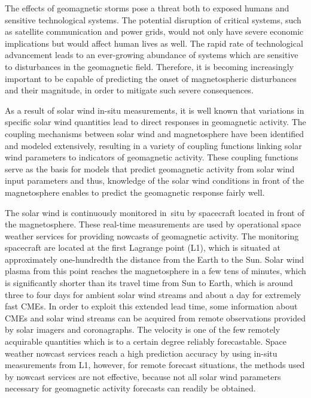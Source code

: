 The effects of geomagnetic storms pose a threat both to exposed humans and sensitive technological systems. The potential disruption of critical systems, such as satellite communication and power grids, would not only have severe economic implications but would affect human lives as well. The rapid rate of technological advancement leads to an ever-growing abundance of systems which are sensitive to disturbances in the geomagnetic field. Therefore, it is becoming increasingly important to be capable of predicting the onset of magnetospheric disturbances and their magnitude, in order to mitigate such severe consequences.

As a result of solar wind in-situ measurements, it is well known that variations in specific solar wind quantities lead to direct responses in geomagnetic activity.
\pagebreak
The coupling mechanisms between solar wind and magnetosphere have been identified and modeled extensively, resulting in a variety of coupling functions linking solar wind parameters to indicators of geomagnetic activity. These coupling functions serve as the basis for models that predict geomagnetic activity from solar wind input parameters and thus, knowledge of the solar wind conditions in front of the magnetosphere enables to predict the geomagnetic response fairly well.

The solar wind is continuously monitored in~situ by spacecraft located in front of the magnetosphere. These real-time measurements are used by operational space weather services for providing nowcasts of geomagnetic activity. The monitoring spacecraft are located at the first Lagrange point (L1), which is situated at approximately one-hundredth the distance from the Earth to the Sun.
Solar wind plasma from this point reaches the magnetosphere in a few tens of minutes, which is significantly shorter than its  travel time from Sun to Earth, which is around three to four days for ambient solar wind streams and about a day for extremely fast CMEs.
In order to exploit this extended lead time, some information about CMEs and solar wind streams can be acquired from remote observations provided by solar imagers and coronagraphs. The velocity is one of the few remotely acquirable quantities which is to a certain degree reliably forecastable.
Space weather nowcast services reach a high prediction accuracy by using in-situ measurements from L1, however, for remote forecast situations, the methods used by nowcast services are not effective, because not all solar wind parameters necessary for geomagnetic activity forecasts can readily be obtained.

